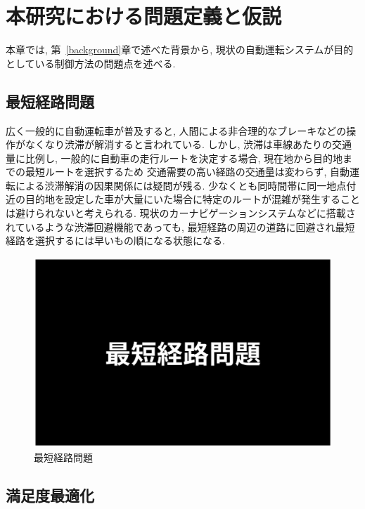 \chapter{本研究における問題定義と仮説}
\label{issue}

本章では, 第~\ref{background}章で述べた背景から, 現状の自動運転システムが目的としている制御方法の問題点を述べる.

\section{最短経路問題}


広く一般的に自動運転車が普及すると, 人間による非合理的なブレーキなどの操作がなくなり渋滞が解消すると言われている.
しかし, 渋滞は車線あたりの交通量に比例し, 一般的に自動車の走行ルートを決定する場合, 現在地から目的地までの最短ルートを選択するため
交通需要の高い経路の交通量は変わらず, 自動運転による渋滞解消の因果関係には疑問が残る.
少なくとも同時間帯に同一地点付近の目的地を設定した車が大量にいた場合に特定のルートが混雑が発生することは避けられないと考えられる.
現状のカーナビゲーションシステムなどに搭載されているような渋滞回避機能であっても, 最短経路の周辺の道路に回避され最短経路を選択するには早いもの順になる状態になる.




\begin{figure}[H]
    \centering  %
    \includegraphics[clip,width = 13.0cm]{assets/shorten_route.eps}
    \caption{最短経路問題}  \label{sample}
\end{figure}

  
\section{満足度最適化}

